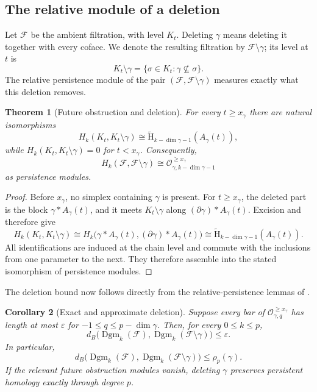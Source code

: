 \documentclass[11pt,letterpaper]{article}
\newtheorem{theorem}{Theorem}[section]
\newtheorem{corollary}[theorem]{Corollary}
\theoremstyle{definition}
\newcommand{\redH}{\widetilde{\mathrm H}}
\newcommand{\Dgm}{\operatorname{Dgm}}
\newcommand{\Oc}{\mathcal O}
\newcommand{\eps}{\varepsilon}
\begin{document}
\subsection{The relative module of a deletion}

Let $\mathcal F$ be the ambient filtration, with level $K_t$. Deleting
$\gamma$ means deleting it together with every coface. We denote the resulting
filtration by $\mathcal F\setminus\gamma$; its level at $t$ is
$$
K_t\setminus\gamma
=\{\sigma\in K_t:\gamma\not\subseteq\sigma\}.
$$
The relative persistence module of the pair
$(\mathcal F,\mathcal F\setminus\gamma)$ measures exactly what this deletion
removes.

\begin{theorem}[Future obstruction and deletion]
\label{thm:future-relative}
For every $t\geq x_\gamma$ there are natural isomorphisms
$$
H_k(K_t,K_t\setminus\gamma)
\cong
\redH_{k-\dim\gamma-1}(A_\gamma(t)),
$$
while $H_k(K_t,K_t\setminus\gamma)=0$ for $t<x_\gamma$. Consequently,
$$
H_k(\mathcal F,\mathcal F\setminus\gamma)
\cong
\Oc_{\gamma,k-\dim\gamma-1}^{\geq x_\gamma}
$$
as persistence modules.
\end{theorem}

\begin{proof}
Before $x_\gamma$, no simplex containing $\gamma$ is present. For
$t\geq x_\gamma$, the deleted part is the block
$\gamma*A_\gamma(t)$, and it meets $K_t\setminus\gamma$ along
$(\partial\gamma)*A_\gamma(t)$. Excision and
 therefore give
$$
H_k(K_t,K_t\setminus\gamma)
\cong
H_k\bigl(\gamma*A_\gamma(t),(\partial\gamma)*A_\gamma(t)\bigr)
\cong
\redH_{k-\dim\gamma-1}(A_\gamma(t)).
$$
All identifications are induced at the chain level and commute with the
inclusions from one parameter to the next. They therefore assemble into the
stated isomorphism of persistence modules.
\end{proof}

The deletion bound now follows directly from the relative-persistence lemmas
of .

\begin{corollary}[Exact and approximate deletion]
\label{cor:trimming}
Suppose every bar of
$\Oc_{\gamma,q}^{\geq x_\gamma}$ has length at most $\eps$ for
$-1\leq q\leq p-\dim\gamma$. Then, for every $0\leq k\leq p$,
$$
d_B\bigl(
\Dgm_k(\mathcal F),
\Dgm_k(\mathcal F\setminus\gamma)
\bigr)
\leq\eps.
$$
In particular,
$$
d_B\bigl(
\Dgm_k(\mathcal F),
\Dgm_k(\mathcal F\setminus\gamma)
\bigr)
\leq\rho_p(\gamma).
$$
If the relevant future obstruction modules vanish, deleting $\gamma$
preserves persistent homology exactly through degree $p$.
\end{corollary}
\end{document}
